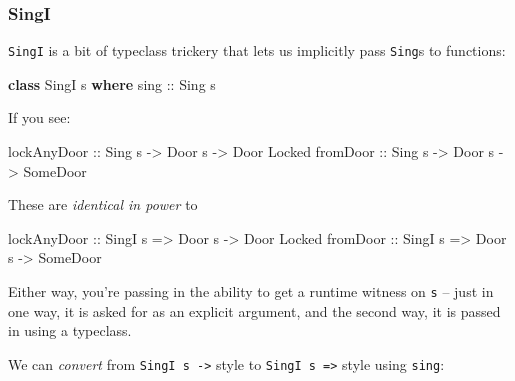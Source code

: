 \documentclass[]{article}
\newenvironment{Shaded}{}{}
\newcommand{\DataTypeTok}[1]{\textcolor[rgb]{0.56,0.13,0.00}{#1}}
\newcommand{\KeywordTok}[1]{\textcolor[rgb]{0.00,0.44,0.13}{\textbf{#1}}}
\newcommand{\NormalTok}[1]{#1}
\newcommand{\OtherTok}[1]{\textcolor[rgb]{0.00,0.44,0.13}{#1}}
\begin{document}
\subsubsection{SingI}\label{singi}

\texttt{SingI} is a bit of typeclass trickery that lets us implicitly pass
\texttt{Sing}s to functions:

\begin{Shaded}
\begin{Highlighting}[]
\KeywordTok{class} \DataTypeTok{SingI}\NormalTok{ s }\KeywordTok{where}
\OtherTok{    sing ::} \DataTypeTok{Sing}\NormalTok{ s}
\end{Highlighting}
\end{Shaded}

If you see:

\begin{Shaded}
\begin{Highlighting}[]
\OtherTok{lockAnyDoor ::} \DataTypeTok{Sing}\NormalTok{  s }\OtherTok{{-}\textgreater{}} \DataTypeTok{Door}\NormalTok{ s }\OtherTok{{-}\textgreater{}} \DataTypeTok{Door} \DataTypeTok{\textquotesingle{}Locked}
\OtherTok{fromDoor    ::} \DataTypeTok{Sing}\NormalTok{  s }\OtherTok{{-}\textgreater{}} \DataTypeTok{Door}\NormalTok{ s }\OtherTok{{-}\textgreater{}} \DataTypeTok{SomeDoor}
\end{Highlighting}
\end{Shaded}

These are \emph{identical in power} to

\begin{Shaded}
\begin{Highlighting}[]
\OtherTok{lockAnyDoor ::} \DataTypeTok{SingI}\NormalTok{ s }\OtherTok{=\textgreater{}} \DataTypeTok{Door}\NormalTok{ s }\OtherTok{{-}\textgreater{}} \DataTypeTok{Door} \DataTypeTok{\textquotesingle{}Locked}
\OtherTok{fromDoor    ::} \DataTypeTok{SingI}\NormalTok{ s }\OtherTok{=\textgreater{}} \DataTypeTok{Door}\NormalTok{ s }\OtherTok{{-}\textgreater{}} \DataTypeTok{SomeDoor}
\end{Highlighting}
\end{Shaded}

Either way, you're passing in the ability to get a runtime witness on \texttt{s}
-- just in one way, it is asked for as an explicit argument, and the second way,
it is passed in using a typeclass.

We can \emph{convert} from \texttt{SingI\ s\ -\textgreater{}} style to
\texttt{SingI\ s\ =\textgreater{}} style using \texttt{sing}:
\end{document}
